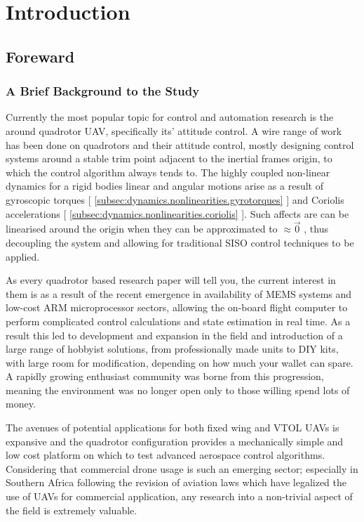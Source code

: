 \chapter{Introduction}
\label{ch:intro}
\section{Foreward}
\label{sec:intro.foreward}
\subsection{A Brief Background to the Study}
\label{subsec:intro.foreward.background}
Currently the most popular topic for control and automation research is the around quadrotor UAV, specifically its' attitude control. A wire range of work has been done on quadrotors and their attitude control, mostly designing control systems around a stable trim point adjacent to the inertial frames origin, to which the control algorithm always tends to. The highly coupled non-linear dynamics for a rigid bodies linear and angular motions arise as a result of gyroscopic torques [ \ref{subsec:dynamics.nonlinearities.gyrotorques} ] and Coriolis accelerations [ \ref{subsec:dynamics.nonlinearities.coriolis} ]. Such affects are can be linearised around the origin when they can be approximated to $\approx \vec{0}$ , thus decoupling the system and allowing for traditional SISO control techniques to be applied.
\par
As every quadrotor based research paper will tell you, the current interest in them is as a result of the recent emergence in availability of MEMS systems and low-cost ARM microprocessor sectors, allowing the on-board flight computer to perform complicated control calculations and state estimation in real time. As a result this led to development and expansion in the field and introduction of a large range of hobbyist solutions, from professionally made units to DIY kits, with large room for modification, depending on how much your wallet can spare. A rapidly growing enthusiast community was borne from this progression, meaning the environment was no longer open only to those willing spend lots of money.
\par
The avenues of potential applications for both fixed wing and VTOL UAVs is expansive and the quadrotor configuration provides a mechanically simple and low cost platform on which to test advanced aerospace control algorithms. Considering that commercial drone usage is such an emerging sector; especially in Southern Africa following the revision of aviation laws \cite{safedrone} which have legalized the use of UAVs for commercial application, any research into a non-trivial aspect of the field is extremely valuable. 
